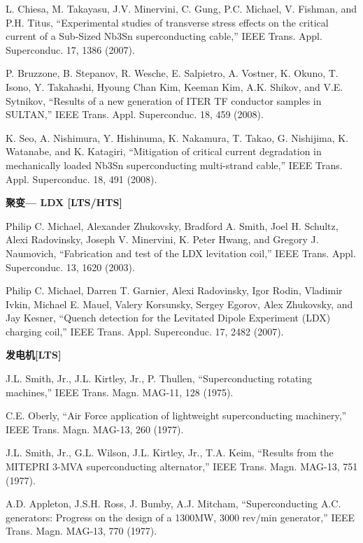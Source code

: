 \noindent [9.54] L. Chiesa, M. Takayasu, J.V. Minervini, C. Gung, P.C. Michael, V. Fishman, and
P.H. Titus, ``Experimental studies of transverse stress effects on the critical current
of a Sub-Sized Nb3Sn superconducting cable,” IEEE Trans. Appl. Superconduc.
17, 1386 (2007).

\noindent [9.55] P. Bruzzone, B. Stepanov, R. Wesche, E. Salpietro, A. Vostner, K. Okuno, T. Isono,
Y. Takahashi, Hyoung Chan Kim, Keeman Kim, A.K. Shikov, and V.E. Sytnikov,
``Results of a new generation of ITER TF conductor samples in SULTAN,”
IEEE Trans. Appl. Superconduc. 18, 459 (2008).

\noindent [9.56] K. Seo, A. Nishimura, Y. Hishinuma, K. Nakamura, T. Takao, G. Nishijima, K.
Watanabe, and K. Katagiri, ``Mitigation of critical current degradation in mechanically
loaded Nb3Sn superconducting multi-strand cable,” IEEE Trans. Appl.
Superconduc. 18, 491 (2008).

\noindent \textbf{聚变--- LDX [LTS/HTS] }

\noindent [9.57] Philip C. Michael, Alexander Zhukovsky, Bradford A. Smith, Joel H. Schultz, Alexi
Radovinsky, Joseph V. Minervini, K. Peter Hwang, and Gregory J. Naumovich,
``Fabrication and test of the LDX levitation coil,” IEEE Trans. Appl. Superconduc.
13, 1620 (2003).

\noindent [9.58] Philip C. Michael, Darren T. Garnier, Alexi Radovinsky, Igor Rodin, Vladimir
Ivkin, Michael E. Mauel, Valery Korsunsky, Sergey Egorov, Alex Zhukovsky, and
Jay Kesner, ``Quench detection for the Levitated Dipole Experiment (LDX) charging
coil,” IEEE Trans. Appl. Superconduc. 17, 2482 (2007).

\noindent \textbf{发电机[LTS] }

\noindent [9.59] J.L. Smith, Jr., J.L. Kirtley, Jr., P. Thullen, ``Superconducting rotating machines,”
IEEE Trans. Magn. MAG-11, 128 (1975).

\noindent [9.60] C.E. Oberly, ``Air Force application of lightweight superconducting machinery,”
IEEE Trans. Magn. MAG-13, 260 (1977).

\noindent [9.61] J.L. Smith, Jr., G.L. Wilson, J.L. Kirtley, Jr., T.A. Keim, ``Results from the MITEPRI
3-MVA superconducting alternator,” IEEE Trans. Magn. MAG-13, 751
(1977).

\noindent [9.62] A.D. Appleton, J.S.H. Ross, J. Bumby, A.J. Mitcham, ``Superconducting A.C.
generators: Progress on the design of a 1300MW, 3000 rev/min generator,” IEEE
Trans. Magn. MAG-13, 770 (1977).

